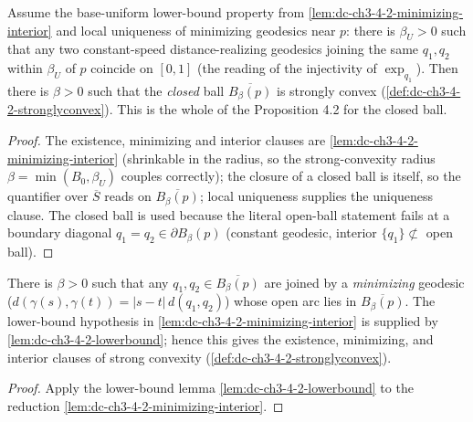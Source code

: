 \begin{lemma}
  \label{lem:dc-ch3-4-2-stronglyconvex-reduction}


  Assume the base-uniform lower-bound property from
  \cref{lem:dc-ch3-4-2-minimizing-interior} and local uniqueness of minimizing
  geodesics near $p$: there is $\beta_U>0$ such that
  any two constant-speed distance-realizing geodesics joining the same $q_1,q_2$ within $\beta_U$ of
  $p$ coincide on $[0,1]$ (the reading of the injectivity of $\exp_{q_1}$). Then there is
  $\beta>0$ such that the \emph{closed} ball $\overline{B_\beta(p)}$ is strongly convex
  (\cref{def:dc-ch3-4-2-stronglyconvex}). This is the whole of the Proposition 4.2 for the
  closed ball.
\end{lemma}
\begin{proof}
  \sketch

  The existence, minimizing and interior clauses are \cref{lem:dc-ch3-4-2-minimizing-interior}
  (shrinkable in the radius, so the strong-convexity radius $\beta=\min(B_0,\beta_U)$ couples
  correctly); the closure of a closed ball is itself, so the quantifier over $\overline{S}$ reads on
  $\overline{B_\beta(p)}$; local uniqueness supplies the uniqueness clause. The closed ball is used
  because the literal open-ball statement fails at a boundary diagonal $q_1=q_2\in\partial B_\beta(p)$
  (constant geodesic, interior $\{q_1\}\not\subset$ open ball).
\end{proof}

\begin{lemma}
  \label{lem:dc-ch3-4-2-minimizing-interior-uncond}


  There is $\beta>0$ such that any $q_1,q_2\in\overline{B_\beta(p)}$ are joined by a \emph{minimizing}
  geodesic ($d(\gamma(s),\gamma(t))=|s-t|\,d(q_1,q_2)$) whose open arc lies in $\overline{B_\beta(p)}$.
  The lower-bound hypothesis in \cref{lem:dc-ch3-4-2-minimizing-interior} is supplied by
  \cref{lem:dc-ch3-4-2-lowerbound}; hence this gives the existence, minimizing, and interior
  clauses of strong convexity (\cref{def:dc-ch3-4-2-stronglyconvex}).
\end{lemma}
\begin{proof}
  \sketch

  Apply the lower-bound lemma \cref{lem:dc-ch3-4-2-lowerbound} to the reduction
  \cref{lem:dc-ch3-4-2-minimizing-interior}.
\end{proof}

